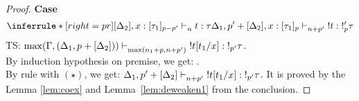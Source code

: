 \documentclass{article}
\begin{document}
\begin{proof}
\noindent \textbf{Case}
\[
\inferrule*[right = pr]
   {[\Delta_2], x:[\tau_1]_{p - p'}\jtype{n}{}{t}{\tau}}
   {
   \Delta_1, p' + [\Delta_2], x:[\tau_1]_p\jtype{n + p'}{}{!t}{!_p' \tau}
   }
\]
TS: $\max(\Gamma,(\Delta_1, p+[\Delta_2]) ) \mathrel{\vdash_{\max(n_1 + p, n + p')}^{} {!t[t_1/x]} : {!_{p'} \tau}}$.\\
By induction hypothesis on premise, we get:                     .\\
By rule  with $(\star)$, we get: $\Delta_1, p'+[\Delta_2] \mathrel{\vdash_{n + p'}^{} {!t[t_1/x]} : {!_{p'} \tau}} $.
It is proved by the Lemma \ref{lem:coex} and Lemma~\ref{lem:deweaken1} from the conclusion.


\end{proof}
\end{document}
